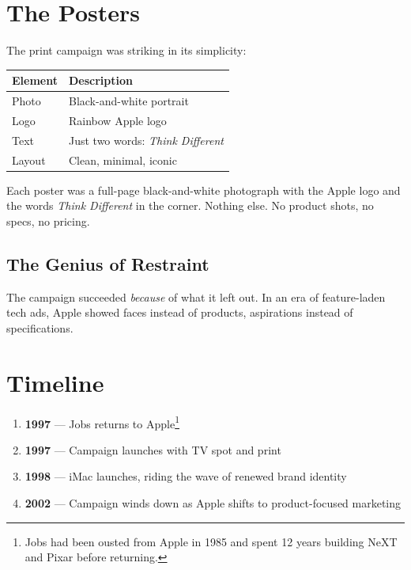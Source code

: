 \documentclass[11pt,a4paper]{article}
\begin{document}
\section{The Posters}

The print campaign was striking in its simplicity:

\begin{center}
\begin{tabular}{ll}
  \toprule
  \textbf{Element} & \textbf{Description} \\
  \midrule
  Photo  & Black-and-white portrait \\
  Logo   & Rainbow Apple logo \\
  Text   & Just two words: \emph{Think Different} \\
  Layout & Clean, minimal, iconic \\
  \bottomrule
\end{tabular}
\end{center}

Each poster was a full-page black-and-white photograph with the Apple logo and the words \emph{Think Different} in the corner. Nothing else. No product shots, no specs, no pricing.

\subsection{The Genius of Restraint}

\begin{notebox}
The campaign succeeded \emph{because} of what it left out. In an era of feature-laden tech ads, Apple showed faces instead of products, aspirations instead of specifications.
\end{notebox}

\section{Timeline}

\begin{enumerate}
  \item \textbf{1997} --- Jobs returns to Apple\footnote{Jobs had been ousted from Apple in 1985 and spent 12 years building NeXT and Pixar before returning.}
  \item \textbf{1997} --- Campaign launches with TV spot and print
  \item \textbf{1998} --- iMac launches, riding the wave of renewed brand identity
  \item \textbf{2002} --- Campaign winds down as Apple shifts to product-focused marketing
\end{enumerate}
\end{document}
